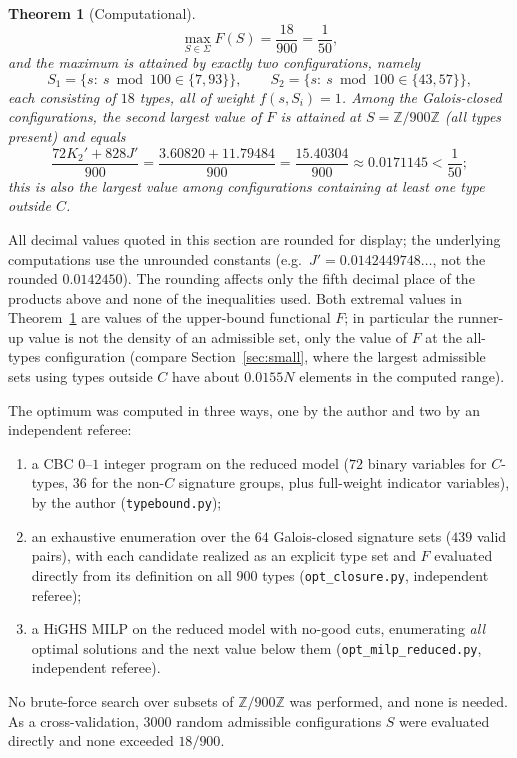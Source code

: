\documentclass[11pt,a4paper]{article}
\theoremstyle{plain}
\newtheorem{theorem}{Theorem}[section]
\theoremstyle{definition}
\theoremstyle{remark}
\newcommand{\Z}{\mathbb{Z}}
\begin{document}
\begin{theorem}[Computational]\label{thm:opt}
\[
 \max_{S\in\Sigma} F(S)=\frac{18}{900}=\frac{1}{50},
\]
and the maximum is attained by exactly two configurations, namely
\[
 S_1=\{s:\ s\bmod 100\in\{7,93\}\},\qquad S_2=\{s:\ s\bmod 100\in\{43,57\}\},
\]
each consisting of $18$ types, all of weight $f(s,S_i)=1$. Among the Galois-closed
configurations, the second largest value of $F$ is attained at $S=\Z/900\Z$ (all types present)
and equals
\[
 \frac{72K_2'+828J'}{900}=\frac{3.60820+11.79484}{900}=\frac{15.40304}{900}\approx 0.0171145<\frac{1}{50};
\]
this is also the largest value among configurations containing at least one type outside $C$.
\end{theorem}

All decimal values quoted in this section are rounded for display; the underlying computations use
the unrounded constants (e.g.\ $J'=0.0142449748\ldots$, not the rounded $0.0142450$). The rounding
affects only the fifth decimal place of the products above and none of the inequalities used.
Both extremal values in Theorem~\ref{thm:opt} are values of the upper-bound functional $F$; in
particular the runner-up value is not the density of an admissible set, only the value of $F$ at
the all-types configuration (compare Section~\ref{sec:small}, where the largest admissible sets
using types outside $C$ have about $0.0155N$ elements in the computed range).

The optimum was computed in three ways, one by the author and two by an independent referee:
\begin{enumerate}
\item a CBC $0$--$1$ integer program on the reduced model ($72$ binary variables for $C$-types, $36$ for
the non-$C$ signature groups, plus full-weight indicator variables), by the author
(\texttt{typebound.py});
\item an exhaustive enumeration over the $64$ Galois-closed signature sets ($439$ valid pairs), with
each candidate realized as an explicit type set and $F$ evaluated directly from its definition on all
$900$ types (\texttt{opt\_closure.py}, independent referee);
\item a HiGHS MILP on the reduced model with no-good cuts, enumerating \emph{all} optimal solutions and
the next value below them (\texttt{opt\_milp\_reduced.py}, independent referee).
\end{enumerate}
No brute-force search over subsets of $\Z/900\Z$ was performed, and none is needed. As a
cross-validation, $3000$ random admissible configurations $S$ were evaluated directly and none
exceeded $18/900$.
\end{document}
